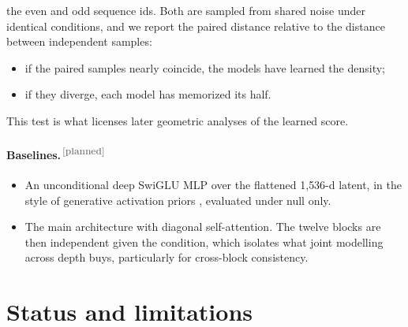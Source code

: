 \documentclass[11pt]{article}
\newcommand{\planned}{\textsuperscript{\textcolor{gray}{\,[planned]}}}
\begin{document}
\begin{itemize}[leftmargin=1.5em]
    the even and odd sequence ids. Both are sampled from shared noise under identical conditions, and we report the paired
    distance relative to the distance between independent samples:
    \begin{itemize}[leftmargin=1.2em]
      \item if the paired samples nearly coincide, the models have learned the density;
      \item if they diverge, each model has memorized its half.
    \end{itemize}
    This test is what licenses later geometric analyses of the learned score.
\end{itemize}

\paragraph{Baselines.\planned}
\begin{itemize}[leftmargin=1.5em]
  \item An unconditional deep SwiGLU MLP over the flattened 1{,}536-d latent, in the style of generative activation priors
    \citep{luo2026glp}, evaluated under null only.
  \item The main architecture with diagonal self-attention. The twelve blocks are then independent given the condition,
    which isolates what joint modelling across depth buys, particularly for cross-block consistency.
\end{itemize}

\section{Status and limitations}
\end{document}

